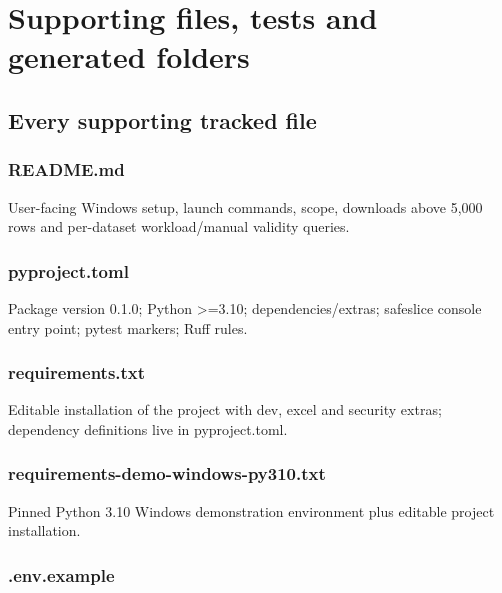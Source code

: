 \chapter{Supporting files, tests and generated folders}

\section{Every supporting tracked file}


\subsection*{README.md}

User-facing Windows setup, launch commands, scope, downloads above 5,000 rows and per-dataset workload/manual validity queries.


\subsection*{pyproject.toml}

Package version 0.1.0; Python >=3.10; dependencies/extras; safeslice console entry point; pytest markers; Ruff rules.


\subsection*{requirements.txt}

Editable installation of the project with dev, excel and security extras; dependency definitions live in pyproject.toml.


\subsection*{requirements-demo-windows-py310.txt}

Pinned Python 3.10 Windows demonstration environment plus editable project installation.


\subsection*{.env.example}

